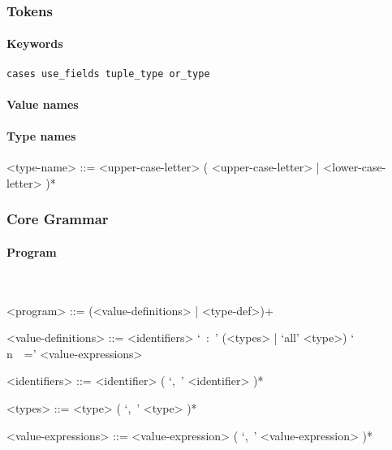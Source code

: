 \documentclass{article}
\begin{document}
\subsubsection{Tokens}

\paragraph{Keywords}

\begin{verbatim}
cases use_fields tuple_type or_type
\end{verbatim}

\paragraph{Value names}

\paragraph{Type names}

\begin{grammar}
<type-name> ::= 
<upper-case-letter> ( <upper-case-letter> | <lower-case-letter> )*
\end{grammar}

\subsubsection{Core Grammar}

\setlength{\grammarparsep}{20pt}
\setlength{\grammarindent}{12em}

\paragraph{Program}
\hspace{1cm}\\
\begin{grammar}

<program> ::= (<value-definitions> | <type-def>)+

<value-definitions> ::=
<identifiers> `\ :\ ' (<types> | `all' <type>) `\\n\ \ =' <value-expressions>

<identifiers> ::= <identifier> ( `,\ ' <identifier> )*  

<types> ::= <type> ( `,\ ' <type> )*  

<value-expressions> ::= <value-expression> ( `,\ ' <value-expression> )*  

\end{grammar}
\hspace{1cm}\\
\end{document}
